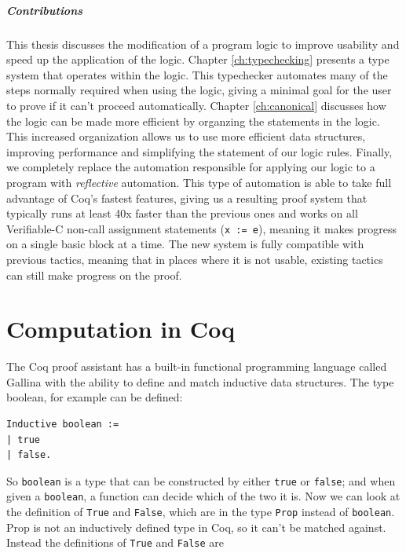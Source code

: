\documentclass{puthesis}
\begin{document}
\paragraph{Contributions}
This thesis discusses the modification of a program logic to improve
usability and speed up the application of the logic. Chapter
\ref{ch:typechecking} presents a type system that operates within the
logic. This typechecker automates many of the steps normally required
when using the logic, giving a minimal goal for the user to prove if
it can't proceed automatically. Chapter \ref{ch:canonical} discusses
how the logic can be made more efficient by organzing the statements
in the logic. This increased organization allows us to use more
efficient data structures, improving performance and simplifying the
statement of our logic rules. Finally, we completely replace the
automation responsible for applying our logic to a program with
\emph{reflective} automation. This type of automation is able to take
full advantage of Coq's fastest features, giving us a resulting proof
system that typically runs at least 40x faster than the previous ones
and works on all Verifiable-C non-call assignment statements
(\lstinline|x := e|), meaning it makes progress on a single basic
block at a time. The new system is fully compatible with previous
tactics, meaning that in places where it is not usable, existing
tactics can still make progress on the proof.

\chapter{Computation in Coq}
\label{ch:computation}
The Coq proof assistant has a built-in functional programming language
called Gallina with the ability to define and match inductive
data structures. The type boolean, for example can be defined:

\begin{lstlisting}
Inductive boolean :=
| true
| false.
\end{lstlisting}

So \lstinline|boolean| is a type that can be constructed by either
\lstinline|true| or \lstinline|false|; and when given a
\lstinline|boolean|, a function can decide which of the two it is. Now
we can look at the definition of \lstinline|True| and
\lstinline|False|, which are in the type
\lstinline|Prop| instead of \lstinline|boolean|. Prop is not an
inductively defined type in Coq, so it can't be matched
against. Instead the definitions of \lstinline|True| and \lstinline|False|
are
\end{document}
